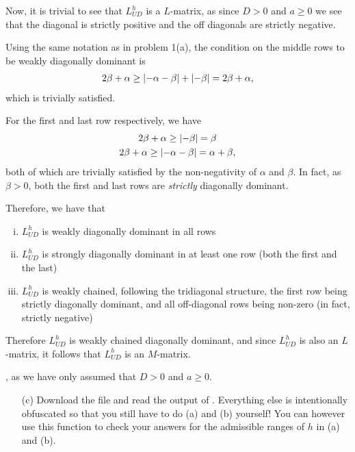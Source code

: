 \begin{problem}{1}
\begin{solution}
Now, it is trivial to see that $L^h_{UD}$ is a $L$-matrix, as since
$D>0$ and $a\geq 0$ we see that the diagonal is strictly positive
and the off diagonals are strictly negative.

Using the same notation as in problem 1(a), the condition on the middle
rows to be weakly diagonally dominant is
\begin{align}\label{Lud_MidRows}
    2\beta + \alpha
    \geq \left| -\alpha -\beta \right| + \left| -\beta \right|
    = 2\beta + \alpha,
\end{align}
which is trivially satisfied.

For the first and last row respectively, we have
\begin{gather}
    2\beta + \alpha \geq \left| -\beta \right| = \beta\label{Lud_FirstRow} \\
    2\beta + \alpha \geq \left| -\alpha -\beta \right| = \alpha + \beta,\label{Lud_FirstRow}
\end{gather}
both of which are trivially satisfied by the non-negativity of 
$\alpha$ and $\beta$. In fact, as $\beta > 0$, both the first and
last rows are \textit{strictly} diagonally dominant.

Therefore, we have that
\begin{enumerate}[(i)]
    \item $L^h_{UD}$ is weakly diagonally dominant in all rows
    \item $L^h_{UD}$ is strongly diagonally dominant in at least one row (both the first and the last)
    \item $L^h_{UD}$ is weakly chained, following the tridiagonal structure, the first row being strictly diagonally dominant, and all off-diagonal rows being non-zero (in fact, strictly negative)
\end{enumerate}
Therefore $L^h_{UD}$ is weakly chained diagonally dominant, and since
$L^h_{UD}$ is also an $L$-matrix, it follows that $L^h_{UD}$ is an
$M$-matrix.

,
as we have only assumed that $D>0$ and $a\geq 0$.

\end{solution}
\pagebreak


\begin{itemize}
	\item[(c)] Download the file  and
	read the output of  \linebreak 
	.
	Everything else is intentionally obfuscated so that
	you still have to do
	(a) and (b) yourself! You can however use this function to
	check your answers for the admissible ranges of $h$ in (a)
	and (b).
	

\end{itemize}
\end{problem}
